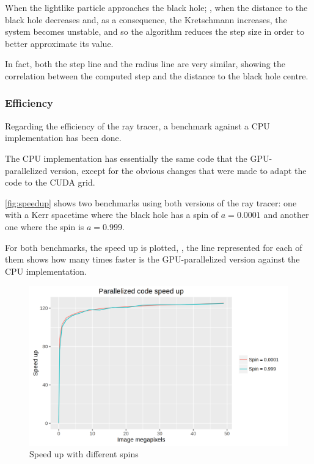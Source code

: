 When the lightlike particle approaches the black hole; \ie, when the distance to the black hole decreases and, as a consequence, the Kretschmann increases, the system becomes unstable, and so the algorithm reduces the step size in order to better approximate its value.

In fact, both the step line and the radius line are very similar, showing the correlation between the computed step and the distance to the black hole centre.

\subsubsection*{Efficiency}

Regarding the efficiency of the ray tracer, a benchmark against a \ac{CPU} implementation has been done.

The \ac{CPU} implementation has essentially the same code that the \ac{GPU}-parallelized version, except for the obvious changes that were made to adapt the code to the \ac{CUDA} grid.

\autoref{fig:speedup} shows two benchmarks using both versions of the ray tracer: one with a Kerr spacetime where the black hole has a spin of $a = 0.0001$ and another one where the spin is $a = 0.999$.

For both benchmarks, the speed up is plotted, \ie, the line represented for each of them shows how many times faster is the \ac{GPU}-parallelized version against the \ac{CPU} implementation.

\begin{figure}[bth]
	\myfloatalign
	\includegraphics[width=1.2\linewidth]{gfx/speedup}
	\caption[Speed up with different spins]{Speed up with different spins}
	\label{fig:speedup}
\end{figure}

